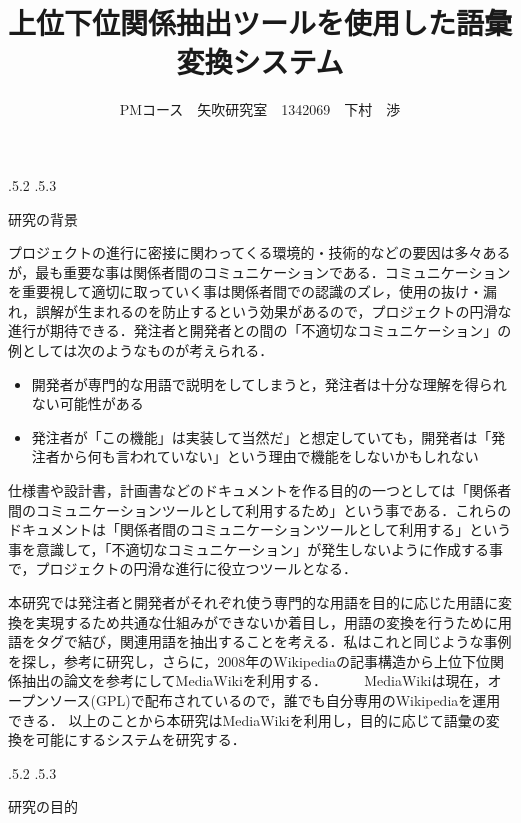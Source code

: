 \documentclass[uplatex]{jsarticle}
\title{\vspace{-14mm}上位下位関係抽出ツールを使用した語彙変換システム}
\author{PMコース　矢吹研究室　1342069　下村　渉}
\date{}%
\makeatletter
\renewcommand{\section}{%
    \if@slide\clearpage\fi
    \@startsection{section}{1}{\z@}%
    {\Cvs \@plus.5\Cdp \@minus.2\Cdp}%
    {.5\Cvs \@plus.3\Cdp}%
    {\normalfont\raggedright}}
\makeatother
\begin{document}
\maketitle





\section{研究の背景}

プロジェクトの進行に密接に関わってくる環境的・技術的などの要因は多々あるが，最も重要な事は関係者間のコミュニケーションである．コミュニケーションを重要視して適切に取っていく事は関係者間での認識のズレ，使用の抜け・漏れ，誤解が生まれるのを防止するという効果があるので，プロジェクトの円滑な進行が期待できる．発注者と開発者との間の「不適切なコミュニケーション」の例としては次のようなものが考えられる．
\begin{itemize}
  \item 開発者が専門的な用語で説明をしてしまうと，発注者は十分な理解を得られない可能性がある
  \item 発注者が「この機能」は実装して当然だ」と想定していても，開発者は「発注者から何も言われていない」という理由で機能をしないかもしれない
  \end{itemize}

仕様書や設計書，計画書などのドキュメントを作る目的の一つとしては「関係者間のコミュニケーションツールとして利用するため」という事である．これらのドキュメントは「関係者間のコミュニケーションツールとして利用する」という事を意識して，「不適切なコミュニケーション」が発生しないように作成する事で，プロジェクトの円滑な進行に役立つツールとなる\cite{a}．

本研究では発注者と開発者がそれぞれ使う専門的な用語を目的に応じた用語に変換を実現するため共通な仕組みができないか着目し，用語の変換を行うために用語をタグで結び，関連用語を抽出することを考える．私はこれと同じような事例を探し，参考に研究し，さらに，2008年のWikipediaの記事構造から上位下位関係抽出の論文を参考にしてMediaWikiを利用する\cite{b}．
　
　MediaWikiは現在，オープンソース(GPL)で配布されているので，誰でも自分専用のWikipediaを運用できる\cite{c}．
以上のことから本研究はMediaWikiを利用し，目的に応じて語彙の変換を可能にするシステムを研究する．





\section{研究の目的}
\end{document}
